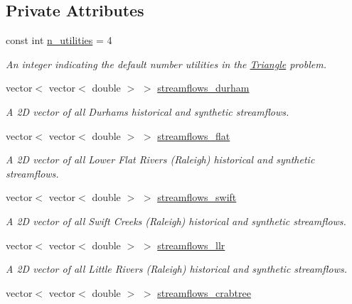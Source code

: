\subsection*{Private Attributes}
\begin{DoxyCompactItemize}
\item 
const int \mbox{\hyperlink{classTriangle_a27fd697e6e14227b71a617ddbcec9653}{n\+\_\+utilities}} = 4
\begin{DoxyCompactList}\small\item\em An integer indicating the default number utilities in the \mbox{\hyperlink{classTriangle}{Triangle}} problem. \end{DoxyCompactList}\item 
vector$<$ vector$<$ double $>$ $>$ \mbox{\hyperlink{classTriangle_a20fe79b08b5b0db16b3154d4d9a9b5eb}{streamflows\+\_\+durham}}
\begin{DoxyCompactList}\small\item\em A 2D vector of all Durham\textquotesingle{}s historical and synthetic streamflows. \end{DoxyCompactList}\item 
vector$<$ vector$<$ double $>$ $>$ \mbox{\hyperlink{classTriangle_a1d93dad189b3fb422f5404f75a08b6f7}{streamflows\+\_\+flat}}
\begin{DoxyCompactList}\small\item\em A 2D vector of all Lower Flat River\textquotesingle{}s (Raleigh) historical and synthetic streamflows. \end{DoxyCompactList}\item 
vector$<$ vector$<$ double $>$ $>$ \mbox{\hyperlink{classTriangle_a6fc8ddba9b9c2afea0ff19ac21343807}{streamflows\+\_\+swift}}
\begin{DoxyCompactList}\small\item\em A 2D vector of all Swift Creek\textquotesingle{}s (Raleigh) historical and synthetic streamflows. \end{DoxyCompactList}\item 
vector$<$ vector$<$ double $>$ $>$ \mbox{\hyperlink{classTriangle_a776794a53c778e47ebe0f8a6b49cd740}{streamflows\+\_\+llr}}
\begin{DoxyCompactList}\small\item\em A 2D vector of all Little River\textquotesingle{}s (Raleigh) historical and synthetic streamflows. \end{DoxyCompactList}\item 
vector$<$ vector$<$ double $>$ $>$ \mbox{\hyperlink{classTriangle_a8c97075d74abc5e38084934fb213fe2a}{streamflows\+\_\+crabtree}}

\end{DoxyCompactItemize}
